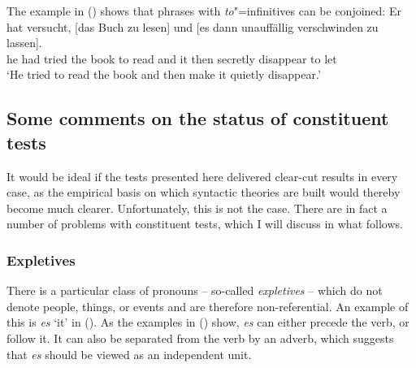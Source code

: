 The example in () shows that phrases with \emph{to}"=infinitives can be conjoined:
\ea
\gll Er hat versucht, [das Buch zu lesen] und [es dann unauffällig verschwinden zu lassen].\\
     he had tried \spacebr{}the book to read and \spacebr{}it then secretly disappear to let\\
\glt `He tried to read the book and then make it quietly disappear.'
\z
{}

\subsection{Some comments on the status of constituent tests}
\label{sec-status-der-ktests}

It would be ideal if the tests presented here delivered clear-cut results in every case, as the empirical
basis on which syntactic theories are built would thereby become much clearer. Unfortunately, this is not the case.
There are in fact a number of problems with constituent tests, which I will discuss in what follows.

\subsubsection{Expletives}

There is a particular class of pronouns -- so-called \emph{expletives} -- which do not denote
people, things, or events and are therefore non-referential. An example of this is \emph{es} `it' in ().
\eal
{}
\zl
As the examples in () show, \emph{es} can either precede the verb, or follow it. It can also be separated from the verb
by an adverb, which suggests that \emph{es} should be viewed as an independent unit.

